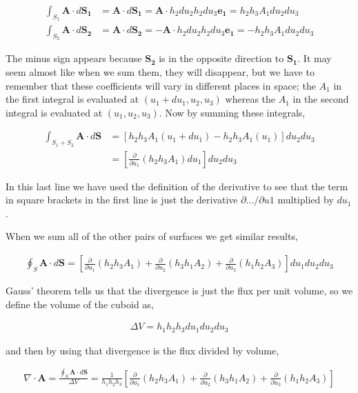 \documentclass[11pt]{amsart}
\begin{document}
\begin{align*}
  \int_{S_1} \mathbf{A}\cdot d\mathbf{S_1} &= \mathbf{A}\cdot d\mathbf{S_1} = \mathbf{A}\cdot h_2 du_2 h_2 du_3 \mathbf{e_1} = h_2 h_3 A_1 du_2 du_3 \\
  \int_{S_2} \mathbf{A}\cdot d\mathbf{S_2} &= \mathbf{A}\cdot d\mathbf{S_2} = -\mathbf{A}\cdot h_2 du_2 h_2 du_3 \mathbf{e_1} = -h_2 h_3 A_1 du_2 du_3
\end{align*}

The minus sign appears because $\mathbf{S_2}$ is in the opposite direction to $\mathbf{S_1}$. It may seem almost like when we sum them, they will disappear, but we have to remember that these coefficients will vary in different places in space; the $A_1$ in the first integral is evaluated at $(u_1 + du_1, u_2, u_3)$ whereas the $A_1$ in the second integral is evaluated at $(u_1, u_2, u_3)$. Now by summing these integrals,

\begin{align*}
  \int_{S_1 + S_2} \mathbf{A}\cdot d\mathbf{S} &= \left[h_2 h_3 A_1(u_1 + du_1) - h_2 h_3 A_1(u_1)\right] du_2 du_3 \\
                                               &= \left[\frac{\partial}{\partial u_1} (h_2 h_3 A_1) du_1\right] du_2 du_3
\end{align*}

In this last line we have used the definition of the derivative to see that the term in square brackets in the first line is just the derivative $\partial \dots / \partial u1$ multiplied by $du_1$.

When we sum all of the other pairs of surfaces we get similar results,

\begin{align*}
  \oint_S \mathbf{A}\cdot d\mathbf{S} = \left[\frac{\partial}{\partial u_1}(h_2h_3A_1) + \frac{\partial}{\partial u_2}(h_3h_1A_2) + \frac{\partial}{\partial u_3}(h_1h_2A_3)\right] du_1 du_2 du_3
\end{align*}

Gauss' theorem tells us that the divergence is just the flux per unit volume, so we define the volume of the cuboid as,

\begin{align*}
  \Delta V = h_1h_2h_3du_1du_2du_3
\end{align*}

and then by using that divergence is the flux divided by volume,

\begin{align*}
  \nabla\cdot\mathbf{A} = \frac{\oint_S \mathbf{A}\cdot d\mathbf{S}}{\Delta V} = \frac{1}{h_1h_2h_3} \left[\frac{\partial}{\partial u_1}(h_2h_3A_1) + \frac{\partial}{\partial u_2}(h_3h_1A_2) + \frac{\partial}{\partial u_3}(h_1h_2A_3)\right]
\end{align*}
\end{document}

